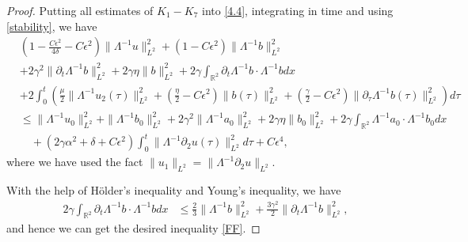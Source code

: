 \documentclass[reqno,11pt]{amsart}
\def\R{\mathbb R}
\numberwithin{Thm}{section}
\begin{document}
\begin{proof}
Putting all estimates of $K_1-K_7$ into \eqref{4.4}, integrating in time and using \eqref{stability}, we have
\begin{align*}
&(1-\frac{C\epsilon^2}{4\delta}-C\epsilon^2)\|\Lambda^{-1} u\|^2_{L^2}+(1-C\epsilon^2)\|\Lambda^{-1} b\|^2_{L^2}\nonumber\\
&+2\gamma^2\|\partial_t\Lambda^{-1}b\|^2_{L^2}
+2\gamma\eta\|b\|^2_{L^2}+2\gamma\int_{\R^2}\partial_t\Lambda^{-1}b\cdot\Lambda^{-1}bdx
\nonumber\\
&+2\int_0^t\left(\frac{\mu}{2}\|\Lambda^{-1}u_2(\tau)\|^2_{L^2}+(\frac{\eta}{2}-C\epsilon^2)\|b(\tau)\|^2_{L^2}+(\frac{\gamma}{2}-C\epsilon^2)\|\partial_{\tau}\Lambda^{-1}b(\tau)\|^2_{L^2}\right)d\tau\nonumber\\
&\leq
\|\Lambda^{-1} u_0\|^2_{L^2}+\|\Lambda^{-1} b_0\|^2_{L^2}+2\gamma^2\|\Lambda^{-1}a_0\|^2_{L^2}
+2\gamma\eta\|b_0\|^2_{L^2}+2\gamma\int_{\R^2}\Lambda^{-1}a_0\cdot\Lambda^{-1}b_0dx\nonumber\\
&\quad+\left(2\gamma\alpha^2+\delta+C\epsilon^2\right)\int_0^t\|\Lambda^{-1}\partial_2u(\tau)\|_{L^2}^2d\tau+C\epsilon^4,
\end{align*}
where we have used the fact $\|u_1\|_{L^2}=\|\Lambda^{-1}\partial_2u\|_{L^2}$.


With the help of H\"{o}lder's inequality and Young's inequality, we have
\begin{align*}
2\gamma\int_{\R^2}\partial_t\Lambda^{-1}b\cdot\Lambda^{-1}bdx
&\leq \frac{2}{3}\|\Lambda^{-1}b\|_{L^2}^2+\frac{3\gamma^2}{2}\|\partial_t\Lambda^{-1} b\|_{L^2}^2,
\end{align*}
and hence we can get the desired inequality \eqref{FF}.
\end{proof}
\end{document}

